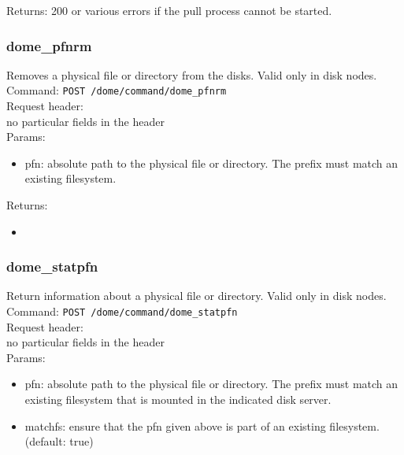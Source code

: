 \documentclass[a4paper,10pt]{scrreprt}
\begin{document}
Returns: 200 or various errors if the pull process cannot be started.


\subsubsection{dome\_pfnrm}

Removes a physical file or directory from the disks. Valid only in disk nodes.\\
Command:
\lstinline"POST /dome/command/dome_pfnrm"\\

Request header:\\
no particular fields in the header\\

Params:
\begin{itemize}
 \item pfn: absolute path to the physical file or directory. The prefix must match an existing filesystem.
\end{itemize}

Returns:
\begin{itemize}
 \item
\end{itemize}














\subsubsection{dome\_statpfn}
Return information about a physical file or directory. Valid only in disk nodes.\\
Command:
\lstinline"POST /dome/command/dome_statpfn"\\
Request header:\\
 no particular fields in the header\\

Params:
\begin{itemize}
 \item pfn: absolute path to the physical file or directory. The prefix must match an existing filesystem that is mounted in the indicated disk server.
 \item matchfs: ensure that the pfn given above is part of an existing filesystem. (default: true)
\end{itemize}
\end{document}
